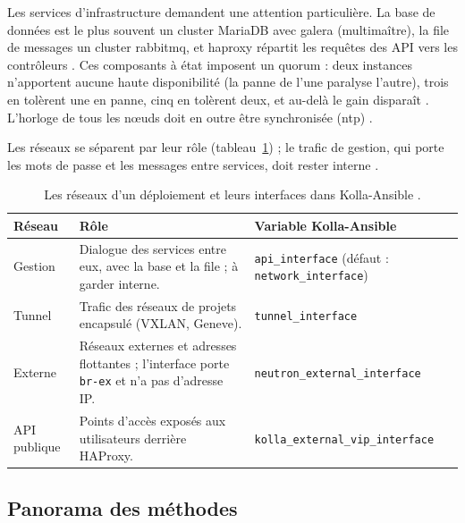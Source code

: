 Les services d'infrastructure demandent une attention particulière. La base de données est le plus souvent un cluster MariaDB avec
\gls{galera} (multimaître), la file de messages un cluster \gls{rabbitmq}, et \gls{haproxy} répartit les requêtes des API vers les contrôleurs
\parencite{osa-service-arch}. Ces composants à état imposent un \gls{quorum} : deux instances n'apportent aucune haute
disponibilité (la panne de l'une paralyse l'autre), trois en tolèrent une en panne, cinq en tolèrent deux, et au-delà le gain
disparaît \parencite{kolla-ansible-production}. L'horloge de tous les nœuds doit en outre être synchronisée (\gls{ntp})
\parencite{install-env}.

Les réseaux se séparent par leur rôle (tableau~\ref{tab:dep-reseaux}) ; le trafic de gestion, qui porte les mots de passe et les
messages entre services, doit rester interne \parencite{kolla-ansible-production}.

\begin{table}[!ht]
\centering
\renewcommand{\arraystretch}{1.3}
\begin{tabular}{@{}>{\raggedright\arraybackslash}p{2.4cm}>{\raggedright\arraybackslash}p{7.6cm}>{\raggedright\arraybackslash}p{5.5cm}@{}}
\toprule
\textbf{Réseau} & \textbf{Rôle} & \textbf{Variable Kolla-Ansible} \\
\midrule
Gestion & Dialogue des services entre eux, avec la base et la file ; à garder interne. & \texttt{api\_\allowbreak interface} (défaut : \texttt{network\_\allowbreak interface}) \\
Tunnel & Trafic des réseaux de projets encapsulé (VXLAN, Geneve). & \texttt{tunnel\_\allowbreak interface} \\
Externe & Réseaux externes et adresses flottantes ; l'interface porte \texttt{br-ex} et n'a pas d'adresse IP. & \texttt{neutron\_\allowbreak external\_\allowbreak interface} \\
API publique & Points d'accès exposés aux utilisateurs derrière HAProxy. & \texttt{kolla\_\allowbreak external\_\allowbreak vip\_\allowbreak interface} \\
\bottomrule
\end{tabular}
\caption{Les réseaux d'un déploiement et leurs interfaces dans Kolla-Ansible \parencite{kolla-ansible-production}.}
\label{tab:dep-reseaux}
\end{table}

\subsection{Panorama des méthodes}\label{sec:dep-panorama}

